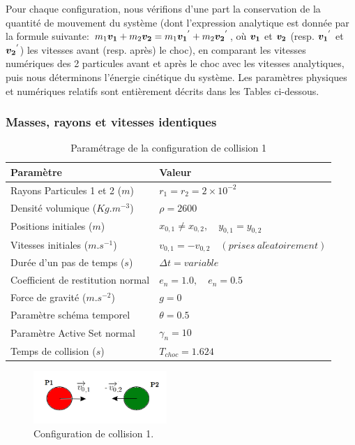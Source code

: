 Pour chaque configuration, nous vérifions d'une part la conservation de la quantité de mouvement du système (dont l'expression analytique est donnée par la formule suivante: $m_1 \boldsymbol{v_1} + m_2 \boldsymbol{v_2} = m_1 {\boldsymbol{v_1}^{'}} + m_2 {\boldsymbol{v_2}^{'}}$, où $\boldsymbol{v_1}$ et $\boldsymbol{v_2}$ (resp. ${\boldsymbol{v_1}^{'}}$ et ${\boldsymbol{v_2}^{'}}$) les vitesses avant (resp. après) le choc), en comparant les vitesses numériques des 2 particules avant et après le choc avec les vitesses analytiques, puis nous déterminons l'énergie cinétique du système. Les paramètres physiques et numériques relatifs sont entièrement décrits dans les Tables ci-dessous. 

\subsubsection{Masses, rayons et vitesses identiques}
\begin{center}
\begin{table}[h]
\begin{tabular}{ |p{5.75cm}|p{6.8cm}| }
 \hline  \rowcolor{lightgray}

 Paramètre& Valeur\\
 \hline
 Rayons Particules 1 et 2  ($m$) & $r_1 = r_2 = 2\times10^{-2}$\\
 Densité volumique ($Kg.m^{-3}$)& $\rho = 2600$\\
 Positions initiales ($m$) & $x_{0,1} \neq x_{0,2}, \quad y_{0,1} = y_{0,2}$\\
 Vitesses initiales  ($m.s^{-1}$)  &$v_{0,1} = -v_{0,2} \quad (prises\ al\acute{e}atoirement) $\\
 Durée d'un pas de temps ($s$)&   $\Delta t = variable$\\
 Coefficient de restitution normal& $e_n = 1.0, \quad e_n = 0.5$\\
 Force de gravité ($m.s^{-2}$)& $g = 0$\\
 Paramètre schéma temporel & $\theta = 0.5$\\
 Paramètre Active Set normal &$\gamma_n = 10$\\
 Temps de collision ($s$)& $T_{choc} = 1.624$\\
 \hline
\end{tabular}
\caption{Paramétrage de la configuration de collision 1}
\end{table}
\end{center}
\vspace{-1.2cm}
\begin{figure}[!h]
  \centering
    \includegraphics[width=0.45\textwidth]{chapitres/chapitre_3/figures/same-radius_same-mass.png}
    \caption{Configuration de collision 1.}\label{conf1}
\end{figure}

